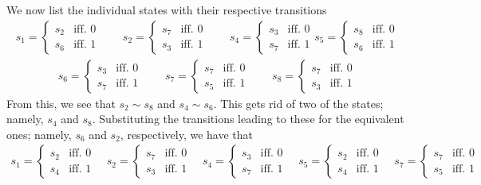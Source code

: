 \documentclass[11pt,a4paper]{article}
\begin{document}
We now list the individual states with their respective transitions
\begin{align*}
	s_1 = 
	\begin{cases}
		s_2 &\mbox{iff. 0}\\
		s_6 &\mbox{iff. 1}
	\end{cases}
	\qquad
	s_2 =
	\begin{cases}
		s_7 &\mbox{iff. 0}\\
		s_3 &\mbox{iff. 1}
	\end{cases}
	\qquad
	s_4 =
	\begin{cases}
		s_3 &\mbox{iff. 0}\\
		s_7 &\mbox{iff. 1}
	\end{cases}
	s_5 = 
	\begin{cases}
		s_8 &\mbox{iff. 0}\\
		s_6 &\mbox{iff. 1}
	\end{cases}
\end{align*}
\begin{align*}
	s_6 =
	\begin{cases}
		s_3 &\mbox{iff. 0}\\
		s_7 &\mbox{iff. 1}
	\end{cases}
	\qquad
	s_7 =
	\begin{cases}
		s_7 &\mbox{iff. 0}\\
		s_5 &\mbox{iff. 1}
	\end{cases}
	\qquad
	s_8 =
	\begin{cases}
		s_7 &\mbox{iff. 0}\\
		s_3 &\mbox{iff. 1}
	\end{cases}
\end{align*}
\newpage\noindent
From this, we see that $s_2 \sim s_8$ and $s_4 \sim s_6$. This gets rid of two
of the states; namely, $s_4$ and $s_8$. Substituting the transitions leading
to these for the equivalent ones; namely, $s_6$ and $s_2$, respectively, we
have that
\begin{align*}
	s_1 = 
	\begin{cases}
		s_2 &\mbox{iff. 0}\\
		s_4 &\mbox{iff. 1}
	\end{cases}
	\quad
	s_2 =
	\begin{cases}
		s_7 &\mbox{iff. 0}\\
		s_3 &\mbox{iff. 1}
	\end{cases}
	\quad
	s_4 =
	\begin{cases}
		s_3 &\mbox{iff. 0}\\
		s_7 &\mbox{iff. 1}
	\end{cases}
	\quad
	s_5 = 
	\begin{cases}
		s_2 &\mbox{iff. 0}\\
		s_4 &\mbox{iff. 1}
	\end{cases}
	\quad
	s_7 =
	\begin{cases}
		s_7 &\mbox{iff. 0}\\
		s_5 &\mbox{iff. 1}
	\end{cases}
\end{align*}
\end{document}
